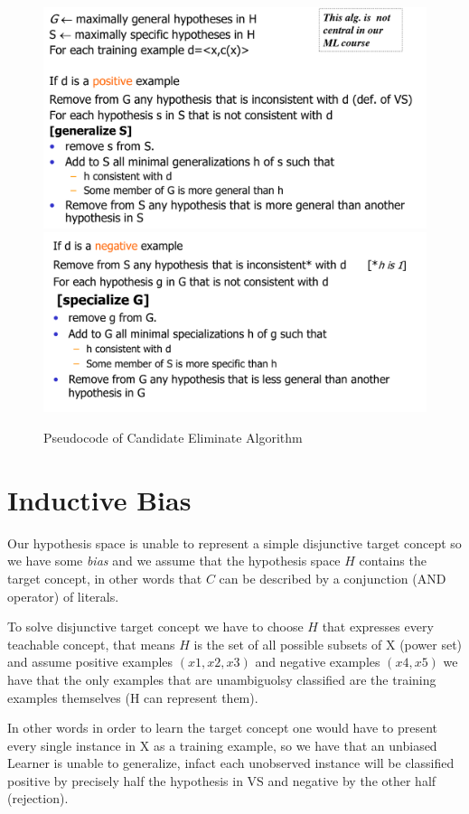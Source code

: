 \begin{figure}
	\caption{Pseudocode of Candidate Eliminate Algorithm}
	\label{alg:candidateAlg}
	\includegraphics[width=\textwidth]{images/candidateAlg}
	\includegraphics[width=\textwidth]{images/candidatePseudo}
\end{figure}


\section{Inductive Bias}
Our hypothesis space is unable to represent a simple disjunctive target concept so we have some \emph{bias} and we assume that the hypothesis space $H$ contains the target concept, 
in other words that $C$ can be described by a conjunction (AND operator) of literals.

To solve disjunctive target concept we have to choose $H$ that expresses every teachable concept, that means $H$ is the set of all possible subsets of X (power set) and 
assume positive examples $(x1, x2, x3)$ and negative examples $(x4, x5)$ we have that the only examples that are unambiguolsy classified are the training examples themselves (H can represent them).

In other words in order to learn the target concept one would have to present every single instance in X as a training example, so we have that an unbiased Learner is unable to generalize,
infact each unobserved instance will be classified positive by precisely half the hypothesis in VS and negative by the other half (rejection).

